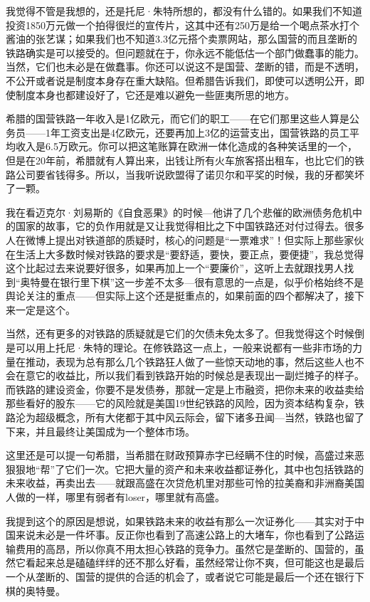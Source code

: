 我觉得不管是我想的，还是托尼·朱特所想的，都没有什么错的。如果我们不知道投资1850万元做一个拍得很烂的宣传片，这其中还有250万是给一个喝点茶水打个酱油的张艺谋；如果我们也不知道3.3亿元搭个卖票网站，那么国营的而且垄断的铁路确实是可以接受的。但问题就在于，你永远不能低估一个部门做蠢事的能力。当然，它们也未必是在做蠢事。你还可以说这不是国营、垄断的错，而是不透明，不公开或者说是制度本身存在重大缺陷。但希腊告诉我们，即使可以透明公开，即使制度本身也都建设好了，它还是难以避免一些匪夷所思的地方。

希腊的国营铁路一年收入是1亿欧元，而它们的职工------在它们那里这些人算是公务员------1年工资支出是4亿欧元，还要再加上3亿的运营支出，国营铁路的员工平均收入是6.5万欧元。你可以把这笔账算在欧洲一体化造成的各种笑话里的一个，但是在20年前，希腊就有人算出来，出钱让所有火车旅客搭出租车，也比它们的铁路公司要省钱得多。所以，当我听说欧盟得了诺贝尔和平奖的时候，我的牙都笑坏了一颗。

我在看迈克尔·刘易斯的《自食恶果》的时候---他讲了几个悲催的欧洲债务危机中的国家的故事，它的负作用就是又让我觉得相比之下中国铁路还对付过得去。很多人在微博上提出对铁道部的质疑时，核心的问题是``一票难求''！但实际上那些家伙在生活上大多数时候对铁路的要求是``要舒适，要快，要正点，要便捷''，我总觉得这个比起过去来说要好很多，如果再加上一个``要廉价''，这听上去就跟找男人找到``奥特曼在银行里下棋''这一步差不太多---很有意思的一点是，似乎价格始终不是舆论关注的重点------但实际上这个还是挺重点的，如果前面的四个都解决了，接下来一定是这个。

当然，还有更多的对铁路的质疑就是它们的欠债未免太多了。但我觉得这个时候倒是可以用上托尼·朱特的理论。在修铁路这一点上，一般来说都有一些非市场的力量在推动，表现为总有那么几个铁路狂人做了一些惊天动地的事，然后这些人也不会在意它的收益比，所以我们看到铁路开始的时候总是表现出一副烂摊子的样子。而铁路的建设资金，你要不是发债券，那就一定是上市融资，把你未来的收益卖给那些看好的股东------它的风险就是美国19世纪铁路的风险，因为资本结构复杂，铁路沦为超级概念，所有大佬都于其中风云际会，留下诸多丑闻---当然，铁路也留了下来，并且最终让美国成为一个整体市场。

这里还是可以提一句希腊，当希腊在财政预算赤字已经瞒不住的时候，高盛过来恶狠狠地``帮''了它们一次。它把大量的资产和未来收益都证券化，其中也包括铁路的未来收益，再卖出去------就跟高盛在次贷危机里对那些可怜的拉美裔和非洲裔美国人做的一样，哪里有弱者有loser，哪里就有高盛。

我提到这个的原因是想说，如果铁路未来的收益有那么一次证券化------其实对于中国来说未必是一件坏事。反正你也看到了高速公路上的大堵车，你也看到了公路运输费用的高昂，所以你真不用太担心铁路的竞争力。虽然它是垄断的、国营的，虽然它看起来总是磕磕绊绊的还不那么好看，虽然经常让你不爽，但可能这也是最后一个从垄断的、国营的提供的合适的机会了，或者说它可能是最后一个还在银行下棋的奥特曼。

